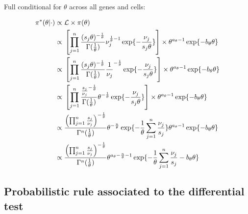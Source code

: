 \begin{Comment}
Full conditional for $\theta$ across all genes and cells:
\begin{fleqn}
\begin{align*}
\pi^*(\theta|\cdot)&\propto{}\mathcal{L}\times\pi(\theta)\\
&\propto{}\left[\prod_{j=1}^{n}\frac{(s_j\theta)^{-\frac{1}{\theta}}}{\Gamma(\frac{1}{\theta})}\nu_j^{\frac{1}{\theta}-1}\exp\lbrace-\frac{\nu_j}{s_j\theta}\rbrace\right]\times{}\theta^{a_\theta-1}\exp\lbrace-b_\theta\theta\rbrace\\
&\propto{}\left[\prod_{j=1}^{n}\frac{(s_j\theta)^{-\frac{1}{\theta}}}{\Gamma(\frac{1}{\theta})}\frac{1}{\nu_j}^{-\frac{1}{\theta}}\exp\lbrace-\frac{\nu_j}{s_j\theta}\rbrace\right]\times\theta^{a_\theta-1}\exp\lbrace-b_\theta\theta\rbrace\\
&\propto{}\left[\prod_{j=1}^{n}\frac{\frac{s_j}{\nu_j}^{-\frac{1}{\theta}}}{\Gamma(\frac{1}{\theta})}\theta^{-\frac{1}{\theta}}\exp\lbrace-\frac{\nu_j}{s_j\theta}\rbrace\right]\times{}\theta^{a_\theta-1}\exp\lbrace-b_\theta\theta\rbrace\\
&\propto{}\frac{\left(\prod_{j=1}^{n}\frac{s_j}{\nu_j}\right)^{-\frac{1}{\theta}}}{\Gamma{}^n(\frac{1}{\theta})}\theta^{-\frac{n}{\theta}}\exp\lbrace-\frac{1}{\theta}\sum_{j=1}^n\frac{\nu_j}{s_j}\rbrace\theta^{a_\theta-1}\exp\lbrace-b_\theta\theta\rbrace\\
&\propto{}\frac{\left(\prod_{j=1}^{n}\frac{s_j}{\nu_j}\right)^{-\frac{1}{\theta}}}{\Gamma{}^n(\frac{1}{\theta})}\theta^{a_\theta-\frac{n}{\theta}-1}\exp\lbrace-\frac{1}{\theta}\sum_{j=1}^n\frac{\nu_j}{s_j}-b_\theta\theta\rbrace
\end{align*}
\end{fleqn}
\end{Comment}

\newpage


\subsection{Probabilistic rule associated to the differential test} \label{sec:differentialtest}

